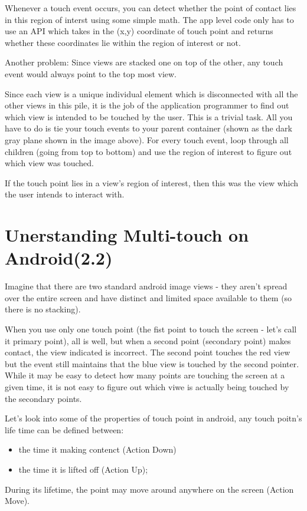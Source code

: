 \documentclass[11pt, a4paper]{book}
\begin{document}
Whenever a touch event occurs, you can detect whether the point of contact lies
in this region of interst using some simple math. The app level code only has to
use an API which takes in the (x,y) coordinate of touch point and returns
whether these coordinates lie within the region of interest or not.

Another problem: Since views are stacked one on top of the other, any touch
event would always point to the top most view.

Since each view is a unique individual element which is disconnected with all 
the other views in this pile, it is the job of the application programmer to 
find out which view is intended to be touched by the user. This is a trivial 
task. All you have to do is tie your touch events to your parent container 
(shown as the dark gray plane shown in the image above). For every touch event,
 loop through all children (going from top to bottom) and use the region of 
 interest to figure out which view was touched.

 If the touch point lies in a view's region of interest, then this was the view
 which the user intends to interact with.

 \section{Unerstanding Multi-touch on Android(2.2)}
Imagine that there are two standard android image views - they aren’t spread 
over the entire screen and have distinct and limited space available to them 
(so there is no stacking).

When you use only one touch point (the fist point to touch the screen - let’s 
call it primary point), all is well, but when a second point (secondary point)
 makes contact, the view indicated is incorrect. The second point touches the
  red view but the event still maintains that the blue view is touched by the
second pointer. While it may be easy to detect how many points are touching the
screen at a given time, it is not easy to figure out which viwe is actually
being touched by the secondary points.

Let's look into some of the properties of touch point in android, any touch
poitn's life time can be defined between:
\begin{itemize}
\item the time it making contenct (Action Down)
\item the time it is lifted off (Action Up);
\end{itemize}
During its lifetime, the point may move around anywhere on the screen (Action
Move). 
\end{document}
